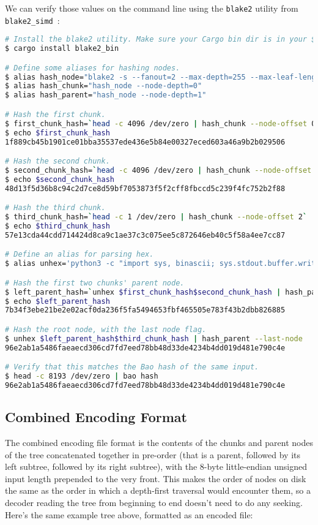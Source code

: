 \documentclass[11pt,notitlepage,a4paper]{article}
\begin{document}
We can verify those values on the command line using the \texttt{blake2} utility from \texttt{blake2\_simd}~\cite{TODO}:
\begin{lstlisting}[basicstyle=\scriptsize\tt,showspaces=false,showstringspaces=false,showtabs=false,breaklines=true,breakatwhitespace=true,language=Bash]
# Install the blake2 utility. Make sure your Cargo bin dir is in your $PATH.
$ cargo install blake2_bin

# Define some aliases for hashing nodes.
$ alias hash_node="blake2 -s --fanout=2 --max-depth=255 --max-leaf-length=4096 --inner-hash-length=32"
$ alias hash_chunk="hash_node --node-depth=0"
$ alias hash_parent="hash_node --node-depth=1"

# Hash the first chunk.
$ first_chunk_hash=`head -c 4096 /dev/zero | hash_chunk --node-offset 0`
$ echo $first_chunk_hash
1f889cb45b1901ce01bba35537ede436e5b84e00327eced603a46a9b2b029506

# Hash the second chunk.
$ second_chunk_hash=`head -c 4096 /dev/zero | hash_chunk --node-offset 1`
$ echo $second_chunk_hash
48d13f5d36b8c94c2d7ce8d59bf7053873f5f2cff8fbccd5c239f4fc752b2f88

# Hash the third chunk.
$ third_chunk_hash=`head -c 1 /dev/zero | hash_chunk --node-offset 2`
$ echo $third_chunk_hash
57e13cda44cdd714424d8ca9c1ae37c3c075ee5c872646eb40c5f58a4ee7cc87

# Define an alias for parsing hex.
$ alias unhex='python3 -c "import sys, binascii; sys.stdout.buffer.write(binascii.unhexlify(sys.argv[1]))"'

# Hash the first two chunks' parent node.
$ left_parent_hash=`unhex $first_chunk_hash$second_chunk_hash | hash_parent`
$ echo $left_parent_hash
7b34f3ebe21be2e02acf0da236f5fa5494653fbf465505e783f43b2dbb826885

# Hash the root node, with the last node flag.
$ unhex $left_parent_hash$third_chunk_hash | hash_parent --last-node
96e2ab1a5486faeaecd306cd7fd7eed78bb48d33de4234b4dd019d481e790c4e

# Verify that this matches the Bao hash of the same input.
$ head -c 8193 /dev/zero | bao hash
96e2ab1a5486faeaecd306cd7fd7eed78bb48d33de4234b4dd019d481e790c4e
\end{lstlisting}

\subsection{Combined Encoding Format}\label{sec:combined}

The combined encoding file format is the contents of the chunks and parent nodes of the tree concatenated together in pre-order (that is a parent, followed by its left subtree, followed by its right subtree), with the 8-byte little-endian unsigned input length prepended to the very front. This makes the order of nodes on disk the same as the order in which a depth-first traversal would encounter them, so a decoder reading the tree from beginning to end doesn't need to do any seeking. Here's the same example tree above, formatted as an encoded file:
\end{document}
